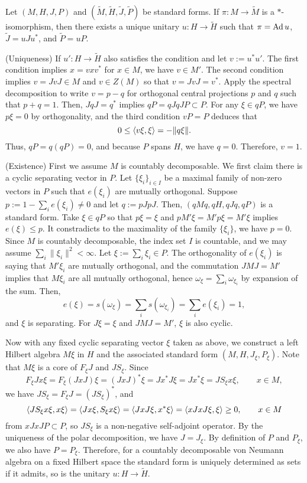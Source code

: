 \documentclass{../../../small}
\begin{document}
\begin{prop}[Uniqueness]
Let $(M,H,J,P)$ and $(\tilde M,\tilde H,\tilde J,\tilde P)$ be standard forms.
If $\pi:M\to\tilde M$ is a $*$-isomorphism, then there exists a unique unitary $u:H\to\tilde H$ such that $\pi=\operatorname{Ad} u$, $\tilde J=uJu^*$, and $\tilde P=uP$.
\end{prop}
\begin{pf}
(Uniqueness)
If $u':H\to \tilde H$ also satisfies the condition and let $v:=u^*u'$.
The first condition implies $x=vxv^*$ for $x\in M$, we have $v\in M'$.
The second condition implies $v=JvJ\in M$ and $v\in Z(M)$ so that $v=JvJ=v^*$.
Apply the spectral decomposition to write $v=p-q$ for orthogonal central projections $p$ and $q$ such that $p+q=1$.
Then, $JqJ=q^*$ implies $qP=qJqJP\subset P$.
For any $\xi\in qP$, we have $p\xi=0$ by orthogonality, and the third condition $vP=P$ deduces that
\[0\le\langle v\xi,\xi\rangle=-\|q\xi\|.\]
Thus, $qP=q(qP)=0$, and because $P$ spans $H$, we have $q=0$.
Therefore, $v=1$.

(Existence)
First we assume $M$ is countably decomposable.
We first claim there is a cyclic separating vector in $P$.
Let $\{\xi_i\}_{i\in I}$ be a maximal family of non-zero vectors in $P$ such that $e(\xi_i)$ are mutually orthogonal.
Suppose $p:=1-\sum_ie(\xi_i)\ne0$ and let $q:=pJpJ$.
Then, $(qMq,qH,qJq,qP)$ is a standard form.
Take $\xi\in qP$ so that $p\xi=\xi$ and $pM'\xi=M'p\xi=M'\xi$ implies $e(\xi)\le p$.
It constradicts to the maximality of the family $\{\xi_i\}$, we have $p=0$.
Since $M$ is countably decomposable, the index set $I$ is countable, and we may assume $\sum_i\|\xi_i\|^2<\infty$.
Let $\xi:=\sum_i\xi_i\in P$.
The orthogonality of $e(\xi_i)$ is saying that $M'\xi_i$ are mutually orthogonal, and the commutation $JMJ=M'$ implies that $M\xi_i$ are all mutually orthogonal, hence $\omega_\xi=\sum_i\omega_{\xi_i}$ by expansion of the sum.
Then,
\[e(\xi)=s(\omega_\xi)=\sum_is(\omega_{\xi_i})=\sum_ie(\xi_i)=1,\]
and $\xi$ is separating.
For $J\xi=\xi$ and $JMJ=M'$, $\xi$ is also cyclic.

Now with any fixed cyclic separating vector $\xi$ taken as above, we construct a left Hilbert algebra $M\xi$ in $H$ and the associated standard form $(M,H,J_\xi,P_\xi)$.
Note that $M\xi$ is a core of $F_\xi J$ and $JS_\xi$.
Since
\[F_\xi Jx\xi=F_\xi(JxJ)\xi=(JxJ)^*\xi=Jx^*J\xi=Jx^*\xi=JS_\xi x\xi,\qquad x\in M,\]
we have $JS_\xi=F_\xi J=(JS_\xi)^*$, and
\[\langle JS_\xi x\xi,x\xi\rangle=\langle Jx\xi,S_\xi x\xi\rangle=\langle JxJ\xi,x^*\xi\rangle=\langle xJxJ\xi,\xi\rangle\ge0,\qquad x\in M\]
from $xJxJP\subset P$, so $JS_\xi$ is a non-negative self-adjoint operator.
By the uniqueness of the polar decomposition, we have $J=J_\xi$.
By definition of $P$ and $P_\xi$, we also have $P=P_\xi$.
Therefore, for a countably decomposable von Neumann algebra on a fixed Hilbert space the standard form is uniquely determined as sets if it admits, so is the unitary $u:H\to\tilde H$.


\end{pf}
\end{document}
